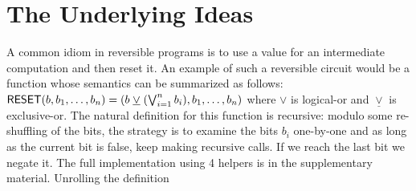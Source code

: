 \section{The Underlying Ideas}





A common idiom in reversible programs is to use a value for an intermediate computation and then reset it. An example of
such a reversible circuit would be a function whose semantics can be summarized as follows:
$\Afun{RESET}(b,b_1,\ldots,b_n) = (b \; \underline{\vee} \; (\bigvee_{i=1}^n b_i),b_1,\ldots,b_n)$ where $\vee$ is
logical-or and $\underline{\vee}$ is exclusive-or. The natural definition for this function is recursive: modulo some
re-shuffling of the bits, the strategy is to examine the bits $b_i$ one-by-one and as long as the current bit is false,
keep making recursive calls. If we reach the last bit we negate it. The full implementation using 4 helpers is in the
supplementary material. Unrolling the definition


